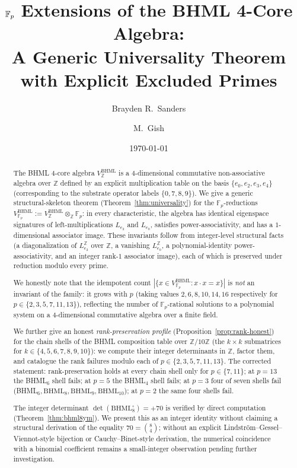 \documentclass[11pt,reqno]{amsart}
\title[$\F_p$ Extensions of $\BHML$]
{$\F_{p}$ Extensions of the BHML 4-Core Algebra: \\
 A Generic Universality Theorem with Explicit Excluded Primes}
\author{Brayden R.\ Sanders}
\author{M.\ Gish}
\date{\today}
\theoremstyle{plain}
\theoremstyle{definition}
\theoremstyle{remark}
\newcommand{\Z}{\mathbb{Z}}
\newcommand{\F}{\mathbb{F}}
\newcommand{\BHML}{\mathrm{BHML}}
\begin{document}
\begin{abstract}
The BHML 4-core algebra $V^{\BHML}_{\Z}$ is a $4$-dimensional
commutative non-associative algebra over $\Z$ defined by an explicit
multiplication table on the basis $\{e_{0}, e_{2}, e_{3}, e_{4}\}$
(corresponding to the substrate operator labels
$\{0, 7, 8, 9\}$). We give a generic structural-skeleton theorem
(Theorem~\ref{thm:universality}) for the $\F_{p}$-reductions
$V^{\BHML}_{\F_{p}} := V^{\BHML}_{\Z} \otimes_{\Z} \F_{p}$: in every
characteristic, the algebra has identical eigenspace signatures of
left-multiplications $L_{e_{2}}$ and $L_{e_{0}}$, satisfies
power-associativity, and has a $1$-dimensional associator image.
These invariants follow from integer-level structural facts (a
diagonalization of $L_{e_{2}}^{\Z}$ over $\Z$, a vanishing
$L_{e_{0}}^{\Z}$, a polynomial-identity power-associativity, and an
integer rank-$1$ associator image), each of which is preserved
under reduction modulo every prime.

We honestly note that the idempotent count
$|\{x \in V^{\BHML}_{\F_{p}} : x \cdot x = x\}|$ is \emph{not} an
invariant of the family: it grows with $p$ (taking values
$2, 6, 8, 10, 14, 16$ respectively for
$p \in \{2, 3, 5, 7, 11, 13\}$), reflecting the number of
$\F_{p}$-rational solutions to a polynomial system on a
$4$-dimensional commutative algebra over a finite field.

We further give an honest \emph{rank-preservation profile}
(Proposition~\ref{prop:rank-honest}) for the chain shells of the
BHML composition table over $\Z/10\Z$ (the $k \times k$ submatrices
for $k \in \{4, 5, 6, 7, 8, 9, 10\}$): we compute their integer
determinants in $\Z$, factor them, and catalogue the rank failures
modulo each of $p \in \{2, 3, 5, 7, 11, 13\}$. The corrected
statement: rank-preservation holds at every chain shell only for
$p \in \{7, 11\}$; at $p = 13$ the BHML$_{6}$ shell fails; at $p = 5$
the BHML$_{4}$ shell fails; at $p = 3$ four of seven shells fail
(BHML$_{6}, \BHML_{8}, \BHML_{9}, \BHML_{10}$); at $p = 2$ the same
four shells fail.

The integer determinant $\det(\BHML_{8}^{\circ}) = +70$ is verified
by direct computation (Theorem~\ref{thm:bhml8ym}). We present this
as an integer identity without claiming a structural derivation of
the equality $70 = \binom{8}{4}$; without an explicit
Lindström--Gessel--Viennot-style bijection or Cauchy--Binet-style
derivation, the numerical coincidence with a binomial coefficient
remains a small-integer observation pending further investigation.


\end{abstract}
\end{document}
